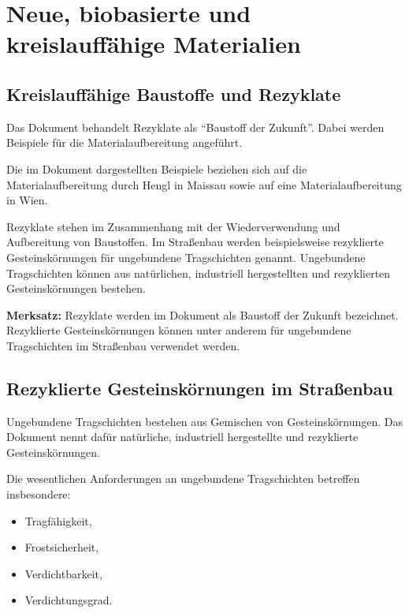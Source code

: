 \documentclass[
  12pt,
  a4paper,
  oneside
]{scrreprt}
\begin{document}
\chapter{Neue, biobasierte und kreislauffähige Materialien}

\section{Kreislauffähige Baustoffe und Rezyklate}

Das Dokument behandelt Rezyklate als ``Baustoff der Zukunft''. Dabei
werden Beispiele für die Materialaufbereitung angeführt.


Die im Dokument dargestellten Beispiele beziehen sich auf die
Materialaufbereitung durch Hengl in Maissau sowie auf eine
Materialaufbereitung in Wien.


Rezyklate stehen im Zusammenhang mit der Wiederverwendung und
Aufbereitung von Baustoffen. Im Straßenbau werden beispielsweise
rezyklierte Gesteinskörnungen für ungebundene Tragschichten genannt.
Ungebundene Tragschichten können aus natürlichen, industriell
hergestellten und rezyklierten Gesteinskörnungen bestehen.


\begin{merksatzbox}
\textbf{Merksatz:}
Rezyklate werden im Dokument als Baustoff der Zukunft bezeichnet.
Rezyklierte Gesteinskörnungen können unter anderem für ungebundene
Tragschichten im Straßenbau verwendet werden.

\end{merksatzbox}

\section{Rezyklierte Gesteinskörnungen im Straßenbau}

Ungebundene Tragschichten bestehen aus Gemischen von
Gesteinskörnungen. Das Dokument nennt dafür natürliche, industriell
hergestellte und rezyklierte Gesteinskörnungen.


Die wesentlichen Anforderungen an ungebundene Tragschichten betreffen
insbesondere:

\begin{itemize}
  \item Tragfähigkeit,
  \item Frostsicherheit,
  \item Verdichtbarkeit,
  \item Verdichtungsgrad.
\end{itemize}
\end{document}

